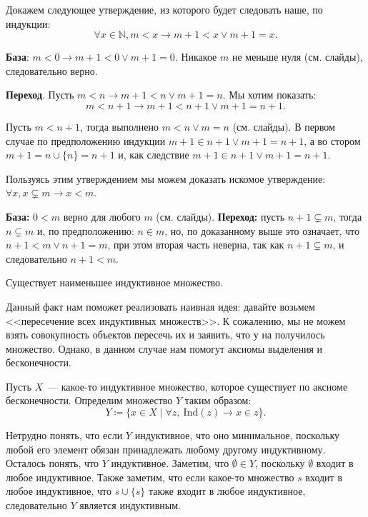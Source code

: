 







Докажем следующее утверждение, из которого будет следовать наше, по индукции:
$$
    \forall x \in \mathbb{N}, m < x \to m + 1 < x \lor m + 1 = x.
$$

\textbf{База}: $m < 0 \to m + 1 < 0 \lor m + 1 = 0$. Никакое $m$ не меньше нуля (см. слайды),
следовательно верно. 

\textbf{Переход}. Пусть $m < n \to m + 1 < n \lor m + 1 = n$. Мы хотим показать:
$$
    m < n + 1 \to m + 1 < n + 1 \lor m + 1 = n + 1.
$$
    
Пусть $m < n + 1$, тогда выполнено $m < n \lor m = n$ (см. слайды). В первом случае по предположению
индукции $m + 1 \in n + 1 \lor m + 1 = n + 1$, а во стором $m + 1 = n \cup \{n\} = n + 1$ и, как
следствие $m + 1 \in n + 1 \lor m + 1 = n + 1$.

\vspace{0.3cm}
Пользуясь этим утверждением мы можем доказать искомое утверждение:
$\forall x, x \subsetneq m \to x < m$.

\textbf{База:} $0 < m$ верно для любого $m$ (см. слайды).
\textbf{Переход:} пусть $n + 1 \subsetneq m$, тогда $n \subsetneq m$ и, по предположению: $n \in m$, но,
по доказанному выше это означает, что $n + 1 < m \lor n + 1 = m$, при этом вторая часть неверна, так как
$n + 1 \subsetneq m$, и следовательно $n + 1 < m$.


\begin{proposition*}
    Существует наименьшее индуктивное множество.
\end{proposition*}

Данный факт нам поможет реализовать наивная идея: давайте возьмем <<пересечение всех индуктивных
множеств>>. К сожалению, мы не можем взять совокупность объектов пересечь их и заявить, что у на
получилось множество. Однако, в данном случае нам помогут аксиомы выделения и бесконечности.

Пусть $X$~--- какое-то индуктивное множество, которое существует по аксиоме бесконечности. Определим
множество $Y$ таким образом:
$$
    Y \coloneqq \{x \in X \mid \forall z,\ \mathrm{Ind}(z) \to x \in z\}.
$$

Нетрудно понять, что если $Y$ индуктивное, что оно минимальное, поскольку любой его элемент обязан
принадлежать любому другому индуктивному. Осталось понять, что $Y$ индуктивное. Заметим, что $\emptyset
\in Y$, поскольку $\emptyset$ входит в любое индуктивное. Также заметим, что если какое-то множество $s$
входит в любое индуктивное, что $s \cup \{s\}$ также входит в любое индуктивное, следовательно $Y$
является индуктивным.


